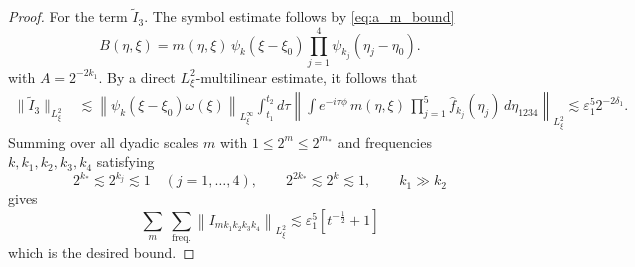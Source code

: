 \documentclass[reqno,english,11pt]{amsart}
\newcommand{\eps}{\varepsilon}
\newcommand{\snorm}[1]{\left\|#1\right\|}
\theoremstyle{definition}
\numberwithin{equation}{section}
\begin{document}
\begin{proof}
For the term $\tilde{I}_3$. The symbol estimate follows by \eqref{eq:a_m_bound}
\begin{equation*}
    B(\eta,\xi)=m(\eta,\xi)\,\psi_k(\xi-\xi_0)\prod_{j=1}^4 \psi_{k_j}(\eta_j-\eta_0).
\end{equation*}
with $A=2^{-2k_1}$. By a direct  $L^2_\xi$-multilinear estimate, it follows that
\begin{align*}
    \|\tilde{I}_3\|_{L^2_{\xi}} &\lesssim \snorm{\psi_{k}(\xi-\xi_0)\omega(\xi)}_{L^{\infty}_{\xi}} \int_{t_1}^{t_2} d \tau \snorm{\int e^{-i\tau\phi}\,m(\eta,\xi)\,\prod^5_{j=1}\hat f_{k_j}(\eta_j) \,d\eta_{1234}
    }_{L^2_{\xi}}
    \lesssim  \eps_1^{5}2^{-2\delta_1}.
\end{align*}
Summing over all dyadic scales $m$ with $1\leq 2^m\leq 2^{m_*}$ and frequencies $k, k_1,k_2,k_3,k_4$ satisfying $$2^{k_*}\lesssim 2^{k_j}\lesssim 1 \quad (j=1,\dots,4), \qquad 2^{2k_*}\lesssim 2^k\lesssim 1, \qquad k_1\gg k_2$$ gives
\begin{equation}
    \sum_{m}\;\sum_{\operatorname{freq.}}
        \snorm{ I_{m k_1 k_2 k_3 k_4} }_{L^2_\xi}
        \lesssim \eps_1^5\left[t^{-\frac{1}{2}}+1\right]
\end{equation}
which is the desired bound.


\end{proof}
\end{document}
